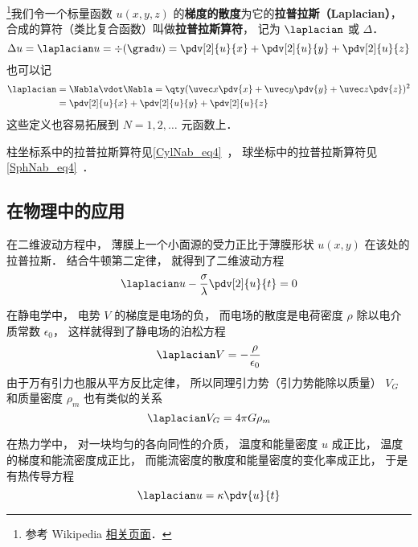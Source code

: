 

\footnote{参考 Wikipedia \href{https://en.wikipedia.org/wiki/Laplace_operator}{相关页面}．}我们令一个标量函数 $u(x, y, z)$ 的\textbf{梯度的散度}为它的\textbf{拉普拉斯（Laplacian）}， 合成的算符（类比复合函数）叫做\textbf{拉普拉斯算符}， 记为 $\laplacian$ 或 $\Delta$．
\begin{equation}
\Delta u = \laplacian u = \div (\grad u) = \pdv[2]{u}{x} + \pdv[2]{u}{y} + \pdv[2]{u}{z}
\end{equation}
也可以记
\begin{equation}
\begin{aligned}
\laplacian &= \Nabla \vdot \Nabla = \qty(\uvec x\pdv{x} + \uvec y\pdv{y} + \uvec z\pdv{z})^2\\
&= \pdv[2]{u}{x} + \pdv[2]{u}{y} + \pdv[2]{u}{z}
\end{aligned}
\end{equation}
这些定义也容易拓展到 $N = 1, 2, \dots$ 元函数上．

柱坐标系中的拉普拉斯算符见\autoref{CylNab_eq4}~， 球坐标中的拉普拉斯算符见\autoref{SphNab_eq4}~．

\subsection{在物理中的应用}
在二维波动方程中， 薄膜上一个小面源的受力正比于薄膜形状 $u(x, y)$ 在该处的拉普拉斯． 结合牛顿第二定律， 就得到了二维波动方程
\begin{equation}
\laplacian u - \frac{\sigma}{\lambda}\pdv[2]{u}{t} = 0
\end{equation}

在静电学中， 电势 $V$ 的梯度是电场的负， 而电场的散度是电荷密度 $\rho$ 除以电介质常数 $\epsilon_0$， 这样就得到了静电场的泊松方程
\begin{equation}
\laplacian V = -\frac{\rho}{\epsilon_0}
\end{equation}
由于万有引力也服从平方反比定律， 所以同理引力势（引力势能除以质量） $V_G$ 和质量密度 $\rho_m$ 也有类似的关系
\begin{equation}
\laplacian V_G = 4\pi G \rho_m
\end{equation}

在热力学中， 对一块均匀的各向同性的介质， 温度和能量密度 $u$ 成正比， 温度的梯度和能流密度成正比， 而能流密度的散度和能量密度的变化率成正比， 于是有热传导方程
\begin{equation}
\laplacian u = \kappa \pdv{u}{t}
\end{equation}
